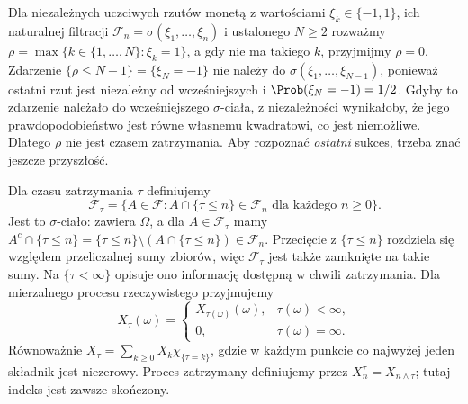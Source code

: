 \begin{przyklad}
Dla niezależnych uczciwych rzutów monetą z wartościami
$\xi_k\in\{-1,1\}$, ich naturalnej filtracji
$\mathcal F_n=\sigma(\xi_1,\ldots,\xi_n)$
i ustalonego $N\geq2$
rozważmy $\rho=\max\{k\in\{1,\ldots,N\}:\xi_k=1\}$,
a gdy nie ma takiego $k$, przyjmijmy $\rho=0$.
Zdarzenie $\{\rho\leq N-1\}=\{\xi_N=-1\}$
nie należy do $\sigma(\xi_1,\ldots,\xi_{N-1})$,
ponieważ ostatni rzut jest niezależny od wcześniejszych
i $\Prob(\xi_N=-1)=1/2$. Gdyby to zdarzenie
należało do wcześniejszego $\sigma$-ciała, z niezależności
wynikałoby, że jego prawdopodobieństwo jest równe
własnemu kwadratowi, co jest niemożliwe.
Dlatego $\rho$ nie jest czasem zatrzymania. Aby rozpoznać \emph{ostatni} sukces,
trzeba znać jeszcze przyszłość.
\end{przyklad}

\begin{definicja}
Dla czasu zatrzymania $\tau$ definiujemy
\[
\mathcal F_\tau=
\{A\in\mathcal F: A\cap\{\tau\leq n\}\in\mathcal F_n
\text{ dla każdego }n\geq0\}.
\]
Jest to $\sigma$-ciało: zawiera $\Omega$, a dla
$A\in\mathcal F_\tau$ mamy
$A^c\cap\{\tau\leq n\}=\{\tau\leq n\}\setminus
(A\cap\{\tau\leq n\})\in\mathcal F_n$.
Przecięcie z $\{\tau\leq n\}$ rozdziela się względem
przeliczalnej sumy zbiorów, więc $\mathcal F_\tau$
jest także zamknięte na takie sumy.
Na $\{\tau<\infty\}$ opisuje ono informację dostępną
w chwili zatrzymania.
Dla mierzalnego procesu rzeczywistego przyjmujemy
\[
X_\tau(\omega)=
\begin{cases}
X_{\tau(\omega)}(\omega),&\tau(\omega)<\infty,\\
0,&\tau(\omega)=\infty.
\end{cases}
\]
Równoważnie $X_\tau=\sum_{k\geq0}X_k\chi_{\{\tau=k\}}$,
gdzie w każdym punkcie co najwyżej jeden składnik
jest niezerowy. Proces zatrzymany definiujemy przez
$X^\tau_n=X_{n\wedge\tau}$; tutaj indeks jest zawsze
skończony.
\end{definicja}

